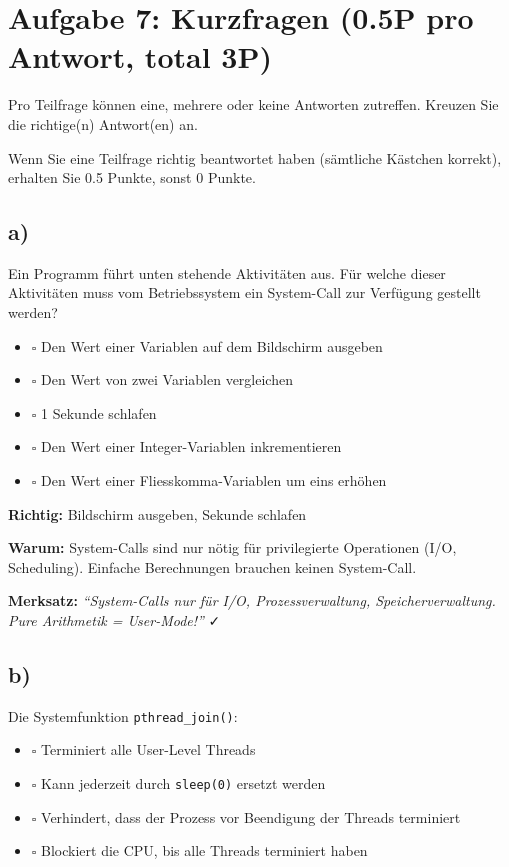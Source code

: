 \documentclass[a4paper,11pt]{article}
\begin{document}
\section{Aufgabe 7: Kurzfragen (0.5P pro Antwort, total 3P)}
Pro Teilfrage können eine, mehrere oder keine Antworten zutreffen.
Kreuzen Sie die richtige(n) Antwort(en) an.

\begin{tcolorbox}[colback=yellow!10!white,colframe=orange!65!black,title=Bewertung]
Wenn Sie eine Teilfrage richtig beantwortet haben (sämtliche Kästchen korrekt), erhalten Sie 0.5 Punkte,
sonst 0 Punkte.
\end{tcolorbox}

\subsection*{a)}
Ein Programm führt unten stehende Aktivitäten aus. Für welche dieser Aktivitäten muss vom Betriebssystem ein System-Call zur Verfügung gestellt werden?
\begin{itemize}[leftmargin=*]
  \item $\square$ Den Wert einer Variablen auf dem Bildschirm ausgeben
  \item $\square$ Den Wert von zwei Variablen vergleichen
  \item $\square$ 1 Sekunde schlafen
  \item $\square$ Den Wert einer Integer-Variablen inkrementieren
  \item $\square$ Den Wert einer Fliesskomma-Variablen um eins erhöhen
\end{itemize}

\begin{tcolorbox}[colback=green!15!white,colframe=green!70!black,title=\textbf{Lösung Aufgabe 7a}]
\textbf{Richtig:} \checkmark Bildschirm ausgeben,  Sekunde schlafen

\textbf{Warum:} System-Calls sind nur nötig für privilegierte Operationen (I/O, Scheduling). Einfache Berechnungen brauchen keinen System-Call.

\textbf{Merksatz:} \textit{``System-Calls nur für I/O, Prozessverwaltung, Speicherverwaltung. Pure Arithmetik = User-Mode!''} ✓
\end{tcolorbox}

\subsection*{b)}
Die Systemfunktion \texttt{pthread\_join()}:
\begin{itemize}[leftmargin=*]
  \item $\square$ Terminiert alle User-Level Threads
  \item $\square$ Kann jederzeit durch \texttt{sleep(0)} ersetzt werden
  \item $\square$ Verhindert, dass der Prozess vor Beendigung der Threads terminiert
  \item $\square$ Blockiert die CPU, bis alle Threads terminiert haben
\end{itemize}
\end{document}
